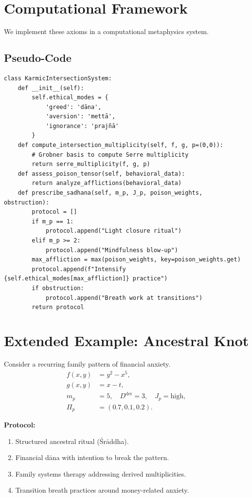 \documentclass[12pt]{article}
\begin{document}
\section{Computational Framework}
We implement these axioms in a computational metaphysics system.

\subsection{Pseudo-Code}
\begin{verbatim}
class KarmicIntersectionSystem:
    def __init__(self):
        self.ethical_modes = {
            'greed': 'dāna', 
            'aversion': 'mettā', 
            'ignorance': 'prajñā'
        }
    def compute_intersection_multiplicity(self, f, g, p=(0,0)):
        # Grobner basis to compute Serre multiplicity
        return serre_multiplicity(f, g, p)
    def assess_poison_tensor(self, behavioral_data):
        return analyze_afflictions(behavioral_data)
    def prescribe_sadhana(self, m_p, J_p, poison_weights, obstruction):
        protocol = []
        if m_p == 1:
            protocol.append("Light closure ritual")
        elif m_p >= 2:
            protocol.append("Mindfulness blow-up")
        max_affliction = max(poison_weights, key=poison_weights.get)
        protocol.append(f"Intensify {self.ethical_modes[max_affliction]} practice")
        if obstruction:
            protocol.append("Breath work at transitions")
        return protocol
\end{verbatim}

\section{Extended Example: Ancestral Knot}
Consider a recurring family pattern of financial anxiety.
\begin{align*}
  f(x,y) &= y^2 - x^5, \\
  g(x,y) &= x - t, \\
  m_p &= 5, \quad D^{\mathrm{der}} = 3, \quad J_p = \text{high}, \\
  \Pi_p &= (0.7, 0.1, 0.2).
\end{align*}

\textbf{Protocol:}
\begin{enumerate}
  \item Structured ancestral ritual (Śrāddha).
  \item Financial dāna with intention to break the pattern.
  \item Family systems therapy addressing derived multiplicities.
  \item Transition breath practices around money-related anxiety.
\end{enumerate}
\end{document}
